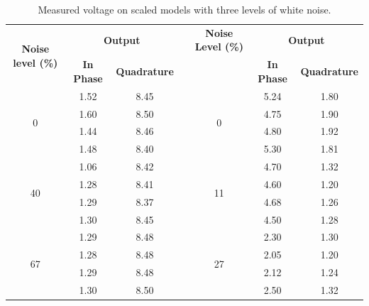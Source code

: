 \documentclass{vie16}
\begin{document}
\begin{table}[h!]
\centering
\caption{Measured voltage on scaled models with three levels of white noise.}
\label{t:scaled_models}
\begin{tabular}{cccl|ccc}
\multirow{2}{*}{\textbf{Noise level (\%)}}  & \multicolumn{2}{c}{\textbf{Output}}     &  & \textbf{Noise Level (\%)} & \multicolumn{2}{c}{\textbf{Output}}     \\
                         & \textbf{In Phase}  & \textbf{Quadrature} &  &  	 				& \textbf{In Phase} & \textbf{Quadrature} 	\\
\multirow{4}{*}{0}	 		& 1.52              & 8.45                &  & 	\multirow{4}{*}{0}	&  5.24				&		1.80			\\
					 		& 1.60              & 8.50                &  &						&  4.75				&		1.90			\\
					 		& 1.44              & 8.46                &  &						&  4.80				&		1.92			\\
					 		& 1.48              & 8.40                &  &						&  5.30		    	&		1.81	 
                                         \\ \hline                                   
\multirow{4}{*}{40}	 		& 1.06              & 8.42                &  & 	\multirow{4}{*}{11}	&	4.70			&		1.32			\\
					 		& 1.28              & 8.41                &  &						&	4.60			&		1.20			\\
					 		& 1.29              & 8.37                &  &						&	4.68			&		1.26			\\
					 		& 1.30              & 8.45                &  &						&	4.50			&		1.28			  
                                         \\ \hline
\multirow{4}{*}{67}	 		& 1.29              & 8.48                &  & 	\multirow{4}{*}{27}	&	2.30			&		1.30			\\
					 		& 1.28              & 8.48                &  &						&	2.05			&		1.20			\\
					 		& 1.29              & 8.48                &  &						&	2.12			&		1.24			\\
					 		& 1.30              & 8.50                &  &						&	2.50			&		1.32			  
                                          \\ \hline
\end{tabular}
\end{table}
\end{document}
